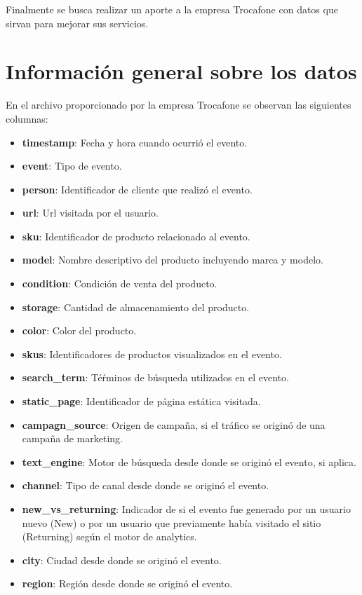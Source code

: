 \documentclass[a4paper]{article}
\begin{document}
Finalmente se busca realizar un aporte a la empresa Trocafone con datos que sirvan para mejorar sus servicios. 

\section{Información general sobre los datos}

En el archivo proporcionado por la empresa Trocafone se observan las siguientes columnas:

\begin{itemize}
	\item \textbf{timestamp}: Fecha y hora cuando ocurrió el evento.
	\item \textbf{event}: Tipo de evento.
	\item \textbf{person}: Identificador de cliente que realizó el evento.
	\item \textbf{url}: Url visitada por el usuario.
	\item \textbf{sku}: Identificador de producto relacionado al evento.
	\item \textbf{model}: Nombre descriptivo del producto incluyendo marca y modelo.
	\item \textbf{condition}: Condición de venta del producto.
	\item \textbf{storage}: Cantidad de almacenamiento del producto.
	\item \textbf{color}: Color del producto.	
	\item \textbf{skus}: Identificadores de productos visualizados en el evento.
	\item \textbf{search\_term}: Téŕminos de búsqueda utilizados en el evento.
	\item \textbf{static\_page}: Identificador de página estática visitada.
	\item \textbf{campagn\_source}: Origen de campaña, si el tráfico se originó de una campaña de marketing.
	\item \textbf{text\_engine}: Motor de búsqueda desde donde se originó el evento, si aplica.
	\item \textbf{channel}: Tipo de canal desde donde se originó el evento.
	\item \textbf{new\_vs\_returning}: Indicador de si el evento fue generado por un usuario nuevo (New) o por un usuario que previamente había visitado el sitio (Returning) según el motor de analytics.
	\item \textbf{city}: Ciudad desde donde se originó el evento.
	\item \textbf{region}: Región desde donde se originó el evento.

\end{itemize}
\end{document}
